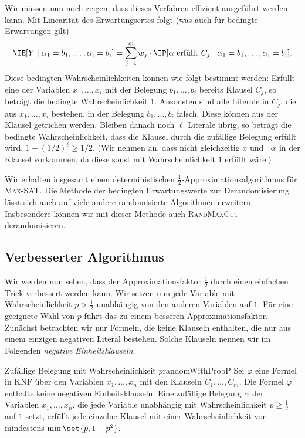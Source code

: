 \documentclass[language=ngerman,algolist]{TemplateLecture}
\begin{document}
Wir müssen nun noch zeigen, dass dieses Verfahren effizient ausgeführt werden kann. Mit Linearität des Erwartungsertes folgt (was auch für bedingte Erwartungen gilt)
\begin{equation*}
    \IE[Y \mid \alpha_1 = b_1, \ldots, \alpha_i = b_i] = \sum_{j = 1}^m w_j \cdot \IP[\text{$\alpha$ erfüllt $C_j$} \mid \alpha_1 = b_1, \ldots, \alpha_i = b_i].
\end{equation*}
Diese bedingten Wahrscheinlichkeiten können wie folgt bestimmt werden: Erfüllt eine der Variablen $x_1, \ldots, x_i$ mit der Belegung $b_1, \ldots, b_i$ bereits Klausel $C_j$, so beträgt die bedingte Wahrscheinlichkeit $1$. Ansonsten sind alle Literale in $C_j$, die aus $x_1, \ldots, x_i$ bestehen, in der Belegung $b_1, \ldots, b_i$ falsch. Diese können aus der Klausel getrichen werden. Bleiben danach noch $\ell$ Literale übrig, so beträgt die bedingte Wahrscheinlichkeit, dass die Klausel durch die zufällige Belegung erfüllt wird, $1 - (1/2)^\ell \geq 1/2$. (Wir nehmen an, dass nicht gleichzeitig $x$ und $\neg x$ in der Klausel vorkommen, da diese sonst mit Wahrscheinlichkeit $1$ erfüllt wäre.)

Wir erhalten insgesamt einen deterministischen $\frac{1}{2}$-Approximationsalgorithmus für \textsc{Max-SAT}. Die Methode der bedingten Erwartungswerte zur Derandomisierung lässt sich auch auf viele andere randomisierte Algorithmen erweitern. Insbesondere können wir mit dieser Methode auch \textsc{RandMaxCut} derandomisieren.

\subsection{Verbesserter Algorithmus}

Wir werden nun sehen, dass der Approximationsfaktor $\frac{1}{2}$ durch einen einfachen Trick verbessert werden kann. Wir setzen nun jede Variable mit Wahrscheinlichkeit $p > \frac{1}{2}$ unabhängig von den anderen Variablen auf $1$. Für eine geeignete Wahl von $p$ führt das zu einem besseren Approximationsfaktor. Zunächst betrachten wir nur Formeln, die keine Klauseln enthalten, die nur aus einem einzigen negativen Literal bestehen. Solche Klauseln nennen wir im Folgenden \emph{negative Einheitsklauseln}.

\begin{lem}{Zufällige Belegung mit Wahrscheinlichkeit $p$}{randomWithProbP}
    Sei $\varphi$ eine Formel in KNF über den Variablen $x_1, \ldots, x_n$ mit den Klauseln $C_1, \ldots, C_m$. Die Formel $\varphi$ enthalte keine negativen Einheitsklauseln. Eine zufällige Belegung $\alpha$ der Variablen $x_1, \ldots, x_n$, die jede Variable unabhängig mit Wahrscheinlichkeit $p \geq \frac{1}{2}$ auf $1$ setzt, erfüllt jede einzelne Klausel mit einer Wahrscheinlichkeit von mindestens $\min\set{p, 1-p^2}$.
\end{lem}
\end{document}

